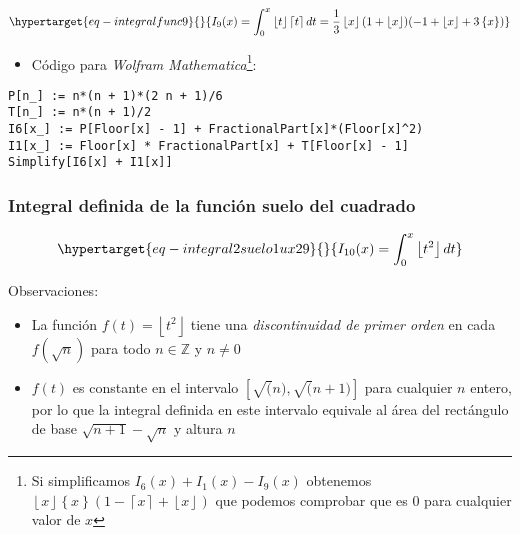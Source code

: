 \documentclass[
  letterpaper,
  DIV=11,
  numbers=noendperiod]{scrreprt}
\providecommand{\tightlist}{%
  \setlength{\itemsep}{0pt}\setlength{\parskip}{0pt}}\usepackage{longtable,booktabs,array}
\begin{document}
\begin{equation}\protect\hypertarget{eq-integralfunc9}{}{
\begin{multline}
I_{9}(x) = \int_0^x \left\lfloor t \right\rfloor \left\lceil  t \right\rceil dt =
\frac{1}{3} \left\lfloor x \right\rfloor (1 + \left\lfloor x \right\rfloor) (-1 + \left\lfloor x \right\rfloor + 3\left\{ x \right\})
\end{multline}
}\label{eq-integralfunc9}\end{equation}

\begin{itemize}
\tightlist
\item
  Código para \emph{Wolfram Mathematica}\footnote{Si simplificamos
    \(I_{6}(x) + I_{1}(x) - I_{9}(x)\) obtenemos
    \(\left\lfloor x \right\rfloor\left\{ x \right\}(1 - \left\lceil  x \right\rceil + \left\lfloor x \right\rfloor)\)
    que podemos comprobar que es \(0\) para cualquier valor de \(x\)}:
\end{itemize}

\begin{verbatim}
P[n_] := n*(n + 1)*(2 n + 1)/6
T[n_] := n*(n + 1)/2
I6[x_] := P[Floor[x] - 1] + FractionalPart[x]*(Floor[x]^2)
I1[x_] := Floor[x] * FractionalPart[x] + T[Floor[x] - 1]
Simplify[I6[x] + I1[x]]
\end{verbatim}

\hypertarget{integral-definida-de-la-funciuxf3n-suelo-del-cuadrado}{%
\subsubsection{Integral definida de la función suelo del
cuadrado}\label{integral-definida-de-la-funciuxf3n-suelo-del-cuadrado}}

\begin{equation}\protect\hypertarget{eq-integral2suelo1ux29}{}{
\begin{multline}
I_{10}(x) = \int_0^x \left\lfloor t^2 \right\rfloor dt
\end{multline}
}\label{eq-integral2suelo1)}\end{equation}

Observaciones:

\begin{itemize}
\item
  La función \(f(t)=\left\lfloor t^2 \right\rfloor\) tiene una
  \emph{discontinuidad de primer orden} en cada \(f(\sqrt{n})\) para
  todo \(n \in \mathbb{Z}\) y \(n \neq 0\)
\item
  \(f(t)\) es constante en el intervalo \([\sqrt(n), \sqrt(n+1)]\) para
  cualquier \(n\) entero, por lo que la integral definida en este
  intervalo equivale al área del rectángulo de base
  \(\sqrt{n+1} - \sqrt{n}\) y altura \(n\)
\end{itemize}
\end{document}
